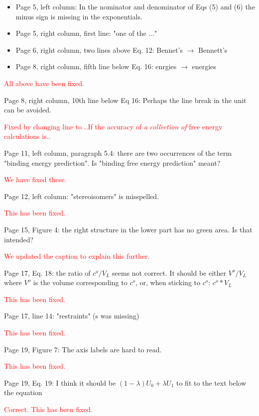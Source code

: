 \documentclass[11pt,a4paper]{letter} %
\begin{document}
\begin{letter}
\begin{itemize}
   \item Page 5, left column: In the nominator and denominator of Eqs (5) and (6) the minus sign is missing in the exponentials.

    \item Page 5, right column, first line: "one of the ..."

   \item Page 6, right column, two lines above Eq. 12: Bennet's $\rightarrow$ Bennett's

   \item Page 8, right column, fifth line below Eq. 16: enrgies  $\rightarrow$ energies
\end{itemize}
\textcolor{red}{All above have been fixed.}

Page 8, right column, 10th line below Eq 16: Perhaps the line break in the unit can be avoided.

\textcolor{red}{Fixed by changing line to ..If the accuracy of \textit{a collection of} free energy calculations is..}

Page 11, left column, paragraph 5.4: there are two occurrences of the term "binding energy prediction". Is "binding free energy prediction" meant?

\textcolor{red}{We have fixed these.}

Page 12, left column: "stereoisomers" is misspelled.

\textcolor{red}{This has been fixed.}

Page 15, Figure 4: the right structure in the lower part has no green area. Is that intended?

\textcolor{red}{We updated the caption to explain this further. }

Page 17, Eq. 18: the ratio of $c^o/V_L$ seems not correct. It should be either $V^o/V_L$ where $V^o$ is the volume corresponding to $c^o$, or, when sticking to $c^o$: $c^o * V_L$

\textcolor{red}{This has been fixed.}

Page 17, line 14: "restraints" (s was missing)

\textcolor{red}{This has been fixed.}

Page 19, Figure 7: The axis labels are hard to read.

\textcolor{red}{This has been fixed.}

Page 19, Eq. 19: I think it should be $(1-\lambda)U_0 + \lambda U_1$ to fit to the text below the equation

\textcolor{red}{Correct. This has been fixed.}


\end{letter}
\end{document}

